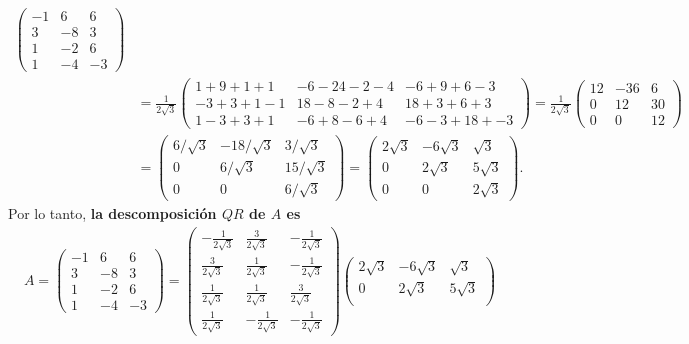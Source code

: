 \documentclass[11pt,letterpaper]{article}
\begin{document}
\begin{itemize}
\begin{align*}
\begin{pmatrix}
-1 & 6 & 6\\
 3 &-8 & 3\\
 1 &-2 & 6\\
 1 &-4 &-3 
\end{pmatrix}\\
&= \frac{1}{2\sqrt{3}}\left(\begin{matrix}
1+9+1+1 & -6-24-2-4 & -6+9+6-3 \\
-3+3+1-1 & 18-8-2+4 & 18+3+6+3\\
1-3+3+1 & -6+8-6+4 & -6-3+18+-3
\end{matrix}\right) = \frac{1}{2\sqrt{3}}\left(\begin{matrix}
12 & -36 & 6 \\
0 & 12 & 30 \\
0 & 0 & 12
\end{matrix}\right)\\
&= \begin{pmatrix}
6/\sqrt{3} & -18/\sqrt{3} & 3/\sqrt{3} \\
0 & 6/\sqrt{3} & 15/\sqrt{3} \\
0 & 0 & 6/\sqrt{3}
\end{pmatrix} = \begin{pmatrix}
2\sqrt{3} & -6\sqrt{3} & \sqrt{3} \\
0 & 2\sqrt{3} & 5\sqrt{3} \\
0 & 0 & 2\sqrt{3}
\end{pmatrix}.
\end{align*}
Por lo tanto, \textbf{la descomposición $QR$ de $A$ es}
\begin{align*}
A=\begin{pmatrix}
-1 & 6 & 6\\
 3 &-8 & 3\\
 1 &-2 & 6\\
 1 &-4 &-3 
\end{pmatrix}=\begin{pmatrix}
-\frac{1}{2\sqrt{3}}& \frac{3}{2\sqrt{3}} &-\frac{1}{2\sqrt{3}}\\
\frac{3}{2\sqrt{3}} & \frac{1}{2\sqrt{3}} &-\frac{1}{2\sqrt{3}}\\
\frac{1}{2\sqrt{3}} & \frac{1}{2\sqrt{3}} & \frac{3}{2\sqrt{3}}\\
\frac{1}{2\sqrt{3}} & -\frac{1}{2\sqrt{3}}&-\frac{1}{2\sqrt{3}}
\end{pmatrix}  \begin{pmatrix}
2\sqrt{3} & -6\sqrt{3} & \sqrt{3} \\
0 & 2\sqrt{3} & 5\sqrt{3} \\

\end{pmatrix}
\end{align*}
\end{itemize}
\end{document}
